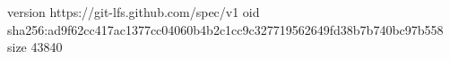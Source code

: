 version https://git-lfs.github.com/spec/v1
oid sha256:ad9f62cc417ac1377cc04060b4b2c1cc9c327719562649fd38b7b740bc97b558
size 43840
